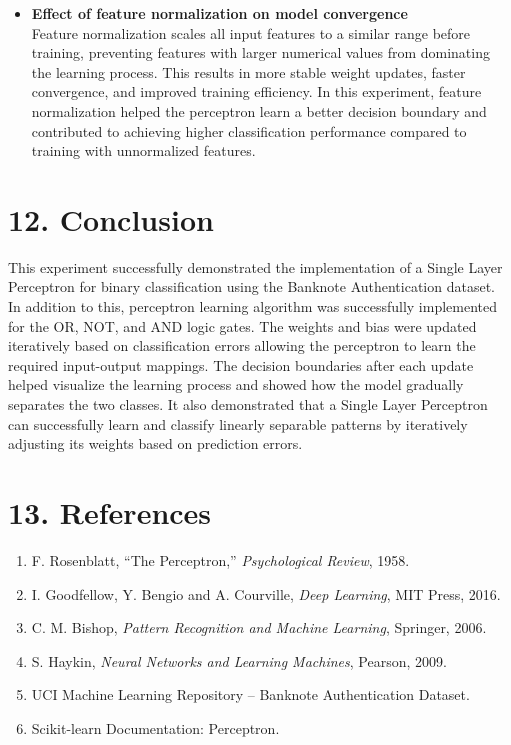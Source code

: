 \documentclass[11pt]{article}
\begin{document}
\begin{itemize}
    \item {\textbf{Effect of feature normalization on model convergence}}\\
    Feature normalization scales all input features to a similar range before training, preventing features with larger numerical values from dominating the learning process. This results in more stable weight updates, faster convergence, and improved training efficiency. In this experiment, feature normalization helped the perceptron learn a better decision boundary and contributed to achieving higher classification performance compared to training with unnormalized features.
\end{itemize}


\section*{12. Conclusion}
This experiment successfully demonstrated the implementation of a Single Layer Perceptron for binary classification using the Banknote Authentication dataset.
In addition to this, perceptron learning algorithm was successfully implemented for the OR, NOT, and AND logic gates. 
The weights and bias were updated iteratively based on classification errors allowing the perceptron to learn the required input-output mappings.
The decision boundaries after each update helped visualize the learning process and showed how the model gradually separates the two classes.
It also demonstrated that a Single Layer Perceptron can successfully learn and classify linearly separable patterns by iteratively adjusting its weights based on prediction errors.



\section*{13. References}

\begin{enumerate}
\item F. Rosenblatt, ``The Perceptron,'' \emph{Psychological Review}, 1958.
\item I. Goodfellow, Y. Bengio and A. Courville, \emph{Deep Learning}, MIT Press, 2016.
\item C. M. Bishop, \emph{Pattern Recognition and Machine Learning}, Springer, 2006.
\item S. Haykin, \emph{Neural Networks and Learning Machines}, Pearson, 2009.
\item UCI Machine Learning Repository -- Banknote Authentication Dataset.
\item Scikit-learn Documentation: Perceptron.
\end{enumerate}
\end{document}
